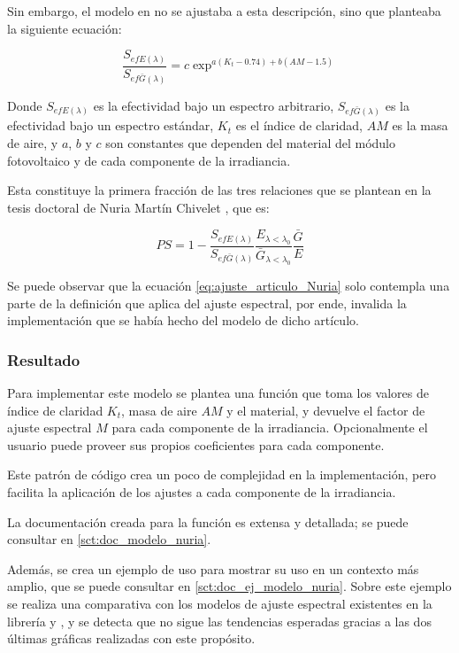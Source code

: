 Sin embargo, el modelo en \cite{Martín_Ruiz_1999} no se ajustaba a esta descripción, sino que planteaba la siguiente ecuación:

\begin{equation} \label{eq:ajuste_articulo_Nuria}
    \frac{S_{efE(\lambda)}}{S_{ef\bar{G}(\lambda)}} = c \exp^{a (K_t - 0.74) + b (AM - 1.5)}
\end{equation}

Donde $S_{efE(\lambda)}$ es la efectividad bajo un espectro arbitrario, $S_{ef\bar{G}(\lambda)}$ es la efectividad bajo un espectro estándar, $K_t$ es el índice de claridad, $AM$ es la masa de aire, y $a$, $b$ y $c$ son constantes que dependen del material del \gls{módulo} fotovoltaico y de cada componente de la irradiancia.

Esta constituye la primera fracción de las tres relaciones que se plantean en la tesis doctoral de Nuria Martín Chivelet \cite{Martín_Chivelet_1999}, que es:

\begin{equation}
    PS = 1 - \frac{S_{efE(\lambda)}}{S_{ef\bar{G}(\lambda)}}\frac{E_{\lambda<\lambda_0}}{\bar{G}_{\lambda<\lambda_0}}\frac{\bar{G}}{E}
\end{equation}

Se puede observar que la ecuación \ref{eq:ajuste_articulo_Nuria} solo contempla una parte de la definición que aplica del ajuste espectral, por ende, invalida la implementación que se había hecho del modelo de dicho artículo.

\subsubsection{Resultado}

Para implementar este modelo se plantea una función que toma los valores de índice de claridad $K_t$, masa de aire $AM$ y el material, y devuelve el factor de ajuste espectral $M$ para cada componente de la irradiancia. Opcionalmente el usuario puede proveer sus propios coeficientes para cada componente.

Este patrón de código crea un poco de complejidad en la implementación, pero facilita la aplicación de los ajustes a cada componente de la irradiancia.

La documentación creada para la función es extensa y detallada; se puede consultar en \ref{sct:doc_modelo_nuria}.

Además, se crea un ejemplo de uso para mostrar su uso en un contexto más amplio, que se puede consultar en \ref{sct:doc_ej_modelo_nuria}. Sobre este ejemplo se realiza una comparativa con los modelos de ajuste espectral existentes en la librería \cite{Lee_Panchula_2016} y \cite{osti919131}, y se detecta que no sigue las tendencias esperadas gracias a las dos últimas gráficas realizadas con este propósito.

